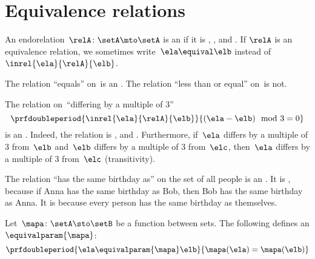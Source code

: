 
\section{Equivalence relations}

\begin{ctdefinition}
    \label{def:equivalence-relation}
    An endorelation~$\relA\colon \setA\mto \setA$ is an  if it is , , and .
    If $\relA$ is an equivalence relation, we sometimes write~$\ela\equival \elb$ instead of~$\inrel{\ela}{\relA}{\elb}$.
\end{ctdefinition}

\begin{example}
    The relation ``equals'' on~\natnumbers is an .
    The relation ``less than or equal'' on~\natnumbers is not.
\end{example}

\begin{example}
    The relation on~\natnumbers ``differing by a multiple of 3''
    \begin{equation}
        \prfdoubleperiod{
            \inrel{\ela}{\relA}{\elb}
        }{
            (\ela-\elb) \mod 3 = 0
        }
    \end{equation}
    is an .
    Indeed, the relation is , and .
    Furthermore, if~$\ela$ differs by a multiple of 3 from~$\elb$ and~$\elb$ differs by a multiple of 3 from~$\elc$, then~$\ela$ differs by a multiple of 3 from~$\elc$ (transitivity).
\end{example}

\begin{example}
    The relation ``has the same birthday as'' on the set of all people is an .
    It is , because if Anna has the same birthday as Bob, then Bob has the same birthday as Anna.
    It is  because every person has the same birthday as themselves.
\end{example}

\begin{example}
    Let~$\mapa\colon \setA \sto \setB$ be a function between sets.
    The following defines an  $\equivalparam{\mapa}$:
    \begin{equation}
        \prfdoubleperiod{
            \ela\equivalparam{\mapa} \elb
        }{
            \mapa(\ela)=\mapa(\elb)
        }
    \end{equation}
\end{example}


